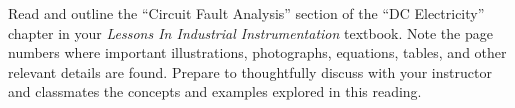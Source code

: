 

Read and outline the ``Circuit Fault Analysis'' section of the ``DC Electricity'' chapter in your {\it Lessons In Industrial Instrumentation} textbook.  Note the page numbers where important illustrations, photographs, equations, tables, and other relevant details are found.  Prepare to thoughtfully discuss with your instructor and classmates the concepts and examples explored in this reading.
















